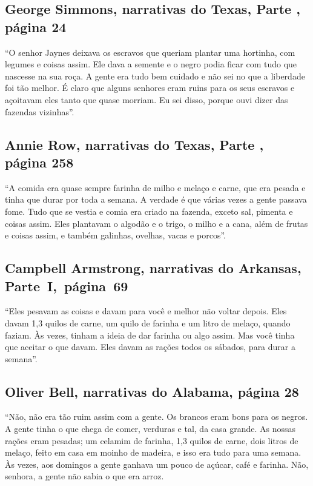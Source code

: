 \subsection{George Simmons, narrativas do Texas, Parte , página 24}
\label{ref239}

``O senhor Jaynes deixava os escravos que queriam plantar uma hortinha,
com legumes e coisas assim. Ele dava a semente e o negro podia ficar com
tudo que nascesse na sua roça. A gente era tudo bem cuidado e não sei no
que a liberdade foi tão melhor. É claro que alguns senhores eram ruins
para os seus escravos e açoitavam eles tanto que quase morriam. Eu sei
disso, porque ouvi dizer das fazendas vizinhas''.

\subsection{Annie Row, narrativas do Texas, Parte , página 258}
\label{ref229}

``A comida era quase sempre farinha de milho e melaço e carne, que era
pesada e tinha que durar por toda a semana. A verdade é que várias vezes
a gente passava fome. Tudo que se vestia e comia era criado na fazenda,
exceto sal, pimenta e coisas assim. Eles plantavam o algodão e o trigo,
o milho e a cana, além de frutas e coisas assim, e também galinhas,
ovelhas, vacas e porcos''.

\subsection{Campbell Armstrong, narrativas do Arkansas, Parte~I,~página~69} \label{ref10}

``Eles pesavam as coisas e davam para você e melhor não voltar depois.
Eles davam 1,3 quilos de carne, um quilo de farinha e um litro de melaço,
quando faziam. Às vezes, tinham a ideia de dar farinha ou algo assim.
Mas você tinha que aceitar o que davam. Eles davam as rações todos os
sábados, para durar a semana''.

\subsection{Oliver Bell, narrativas do Alabama, página 28} \label{ref24}

``Não, não era tão ruim assim com a gente. Os brancos eram bons para os
negros. A gente tinha o que chega de comer, verduras e tal, da casa
grande. As nossas rações eram pesadas; um celamim de farinha, 1,3 quilos de
carne, dois litros de melaço, feito em casa em moinho de madeira, e isso
era tudo para uma semana. Às vezes, aos domingos a gente ganhava um
pouco de açúcar, café e farinha. Não, senhora, a gente não sabia o que
era arroz.


